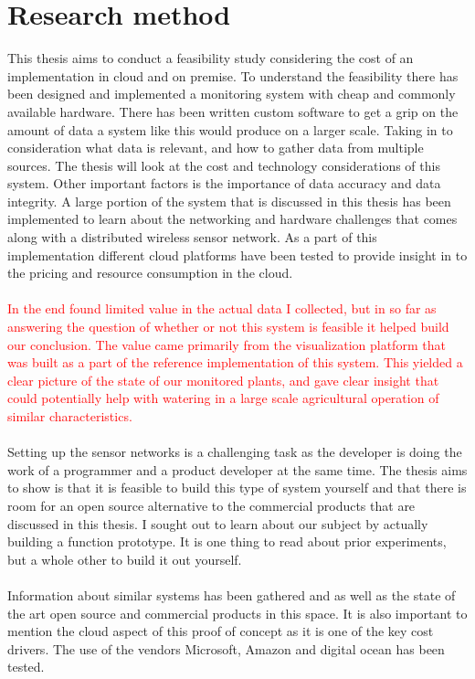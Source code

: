 \documentclass[]{uiophd}
\begin{document}
\section{Research method}
 This thesis aims to conduct a feasibility study considering the cost of an implementation in cloud and on premise. To understand the feasibility there has been designed and implemented a monitoring system with cheap and commonly available hardware. There has been written custom software to get a grip on the amount of data a system like this would produce on a larger scale. Taking in to consideration what data is relevant, and how to gather data from multiple sources. The thesis will look at the cost and technology considerations of this system. Other important factors is the importance of data accuracy and data integrity. A large portion of the system that is discussed in this thesis has been implemented to learn about the networking and hardware challenges that comes along with a distributed wireless sensor network. As a part of this implementation different cloud platforms have been tested to provide insight in to the pricing and resource consumption in the cloud. 
\\\\
\textcolor{red}{In the end found limited value in the actual data I collected, but in so far as answering the question of whether or not this system is feasible it helped build our conclusion. The value came primarily from the visualization platform that was built as a part of the reference implementation of this system. This yielded a clear picture of the state of our monitored plants, and gave clear insight that could potentially help with watering in a large scale agricultural operation of similar characteristics.}
\\\\
Setting up the sensor networks is a challenging task as the developer is doing the work of a programmer and a product developer at the same time. The thesis aims to show is that it is feasible to build this type of system yourself and that there is room for an open source alternative to the commercial products that are discussed in this thesis. I sought out to learn about our subject by actually building a function prototype. It is one thing to read about prior experiments, but a whole other to build it out yourself.
\\\\
Information about similar systems has been gathered and as well as the state of the art open source and commercial products in this space. It is also important to mention the cloud aspect of this proof of concept as it is one of the key cost drivers. The use of the vendors Microsoft, Amazon and digital ocean has been tested.
\end{document}
